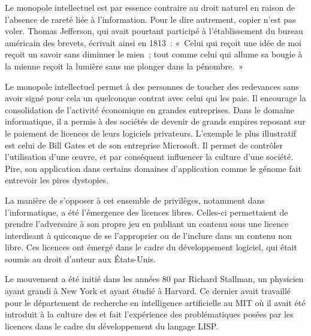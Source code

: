 Le monopole intellectuel est par essence contraire au droit naturel en raison de l'absence de rareté liée à l'information. Pour le dire autrement, copier n'est pas voler. Thomas Jefferson, qui avait pourtant participé à l'établissement du bureau américain des brevets, écrivait ainsi en 1813~: «~Celui qui reçoit une idée de moi reçoit un savoir sans diminuer le mien~; tout comme celui qui allume sa bougie à la mienne reçoit la lumière sans me plonger dans la pénombre.~» %

Le monopole intellectuel permet à des personnes de toucher des redevances sans avoir signé pour cela un quelconque contrat avec celui qui les paie. Il encourage la consolidation de l'activité économique en grandes entreprises. Dans le domaine informatique, il a permis à des sociétés de devenir de grands empires reposant sur le paiement de licences de leurs logiciels privateurs. L'exemple le plus illustratif est celui de Bill Gates et de son entreprise Microsoft. Il permet de contrôler l'utilisation d'une œuvre, et par conséquent influencer la culture d'une société. Pire, son application dans certains domaines d'application comme le génome fait entrevoir les pires dystopies.

La manière de s'opposer à cet ensemble de privilèges, notamment dans l'informatique, a été l'émergence des licences libres. Celles-ci permettaient de prendre l'adversaire à son propre jeu en publiant un contenu sous une licence interdisant à quiconque de se l'approprier ou de l'inclure dans un contenu non libre. Ces licences ont émergé dans le cadre du développement logiciel, qui était soumis au droit d'auteur aux États-Unis.

Le mouvement a été initié dans les années 80 par Richard Stallman, un physicien ayant grandi à New York et ayant étudié à Harvard. Ce dernier avait travaillé pour le département de recherche en intelligence artificielle au MIT où il avait été introduit à la culture des  et fait l'expérience des problématiques posées par les licences dans le cadre du développement du langage LISP.

